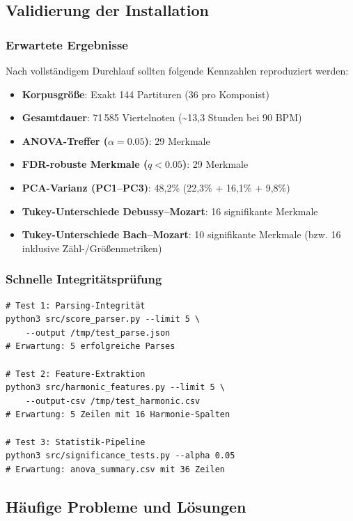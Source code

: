 \documentclass[12pt,a4paper]{article}
\theoremstyle{definition}
\begin{document}
\subsection{Validierung der Installation}

\subsubsection{Erwartete Ergebnisse}

Nach vollständigem Durchlauf sollten folgende Kennzahlen reproduziert werden:
\begin{itemize}
    \item \textbf{Korpusgröße}: Exakt 144 Partituren (36 pro Komponist)
    \item \textbf{Gesamtdauer}: 71\,585 Viertelnoten (\textasciitilde13,3 Stunden bei 90 BPM)
    \item \textbf{ANOVA-Treffer ($\alpha=0.05$)}: 29 Merkmale
    \item \textbf{FDR-robuste Merkmale ($q<0.05$)}: 29 Merkmale
    \item \textbf{PCA-Varianz (PC1--PC3)}: 48,2\% (22,3\% + 16,1\% + 9,8\%)
    \item \textbf{Tukey-Unterschiede Debussy--Mozart}: 16 signifikante Merkmale
    \item \textbf{Tukey-Unterschiede Bach--Mozart}: 10 signifikante Merkmale (bzw. 16 inklusive Zähl-/Größenmetriken)
\end{itemize}

\subsubsection{Schnelle Integritätsprüfung}

\begin{lstlisting}
# Test 1: Parsing-Integrität
python3 src/score_parser.py --limit 5 \
    --output /tmp/test_parse.json
# Erwartung: 5 erfolgreiche Parses

# Test 2: Feature-Extraktion
python3 src/harmonic_features.py --limit 5 \
    --output-csv /tmp/test_harmonic.csv
# Erwartung: 5 Zeilen mit 16 Harmonie-Spalten

# Test 3: Statistik-Pipeline
python3 src/significance_tests.py --alpha 0.05
# Erwartung: anova_summary.csv mit 36 Zeilen
\end{lstlisting}

\subsection{Häufige Probleme und Lösungen}
\end{document}
